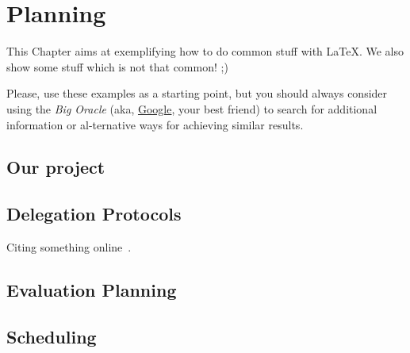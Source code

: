 
%

\makeatletter
\newcommand{\ntifpkgloaded}{%
  \@ifpackageloaded%
}
\makeatother


\chapter{Planning}
\label{cha:planning}

This Chapter aims at exemplifying how to do common stuff with \LaTeX. We also show some stuff which is not that common! ;)

Please, use these examples as a starting point, but you should always consider using the \emph{Big Oracle} (aka, \href{http://www.google.com}{Google}, your best friend) to search for additional information or al-ternative ways for achieving similar results.


\section{Our project} %
\label{sec:our_project}



\section{Delegation Protocols} %
\label{sec:delegation_protocols}

Citing something online~\cite{wiki:shuntingyard,flex,bison}.



\section{Evaluation Planning} %
\label{sec:evaluating_planning}



\section{Scheduling} %
\label{sec:scheduling}



